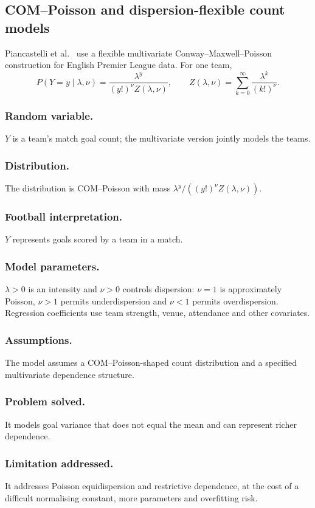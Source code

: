 \documentclass[11pt,a4paper]{amsart}
\numberwithin{equation}{section}
\begin{document}
\subsection{COM--Poisson and dispersion-flexible count models}
Piancastelli et al.~\cite{piancastelli2023} use a flexible multivariate Conway--Maxwell--Poisson construction for English Premier League data. For one team,
\begin{equation}P(Y=y\mid\lambda,\nu)=\frac{\lambda^y}{(y!)^\nu Z(\lambda,\nu)},\qquad Z(\lambda,\nu)=\sum_{k=0}^{\infty}\frac{\lambda^k}{(k!)^\nu}.
\end{equation}

\subsubsection*{Random variable.} $Y$ is a team's match goal count; the multivariate version jointly models the teams.
\subsubsection*{Distribution.} The distribution is COM--Poisson with mass $\lambda^y/((y!)^\nu Z(\lambda,\nu))$.
\subsubsection*{Football interpretation.} $Y$ represents goals scored by a team in a match.
\subsubsection*{Model parameters.} $\lambda>0$ is an intensity and $\nu>0$ controls dispersion: $\nu=1$ is approximately Poisson, $\nu>1$ permits underdispersion and $\nu<1$ permits overdispersion. Regression coefficients use team strength, venue, attendance and other covariates.
\subsubsection*{Assumptions.} The model assumes a COM--Poisson-shaped count distribution and a specified multivariate dependence structure.
\subsubsection*{Problem solved.} It models goal variance that does not equal the mean and can represent richer dependence.
\subsubsection*{Limitation addressed.} It addresses Poisson equidispersion and restrictive dependence, at the cost of a difficult normalising constant, more parameters and overfitting risk.
\end{document}

